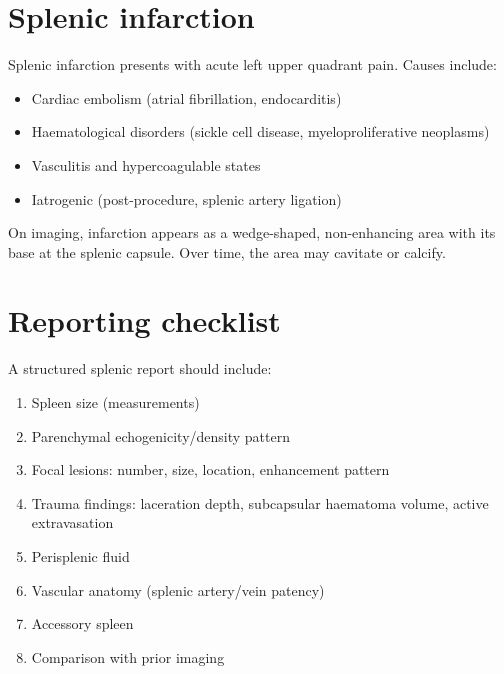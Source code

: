 \section{Splenic infarction}
Splenic infarction presents with acute left upper quadrant pain. Causes include:
\begin{itemize}
    \item Cardiac embolism (atrial fibrillation, endocarditis)
    \item Haematological disorders (sickle cell disease, myeloproliferative neoplasms)
    \item Vasculitis and hypercoagulable states
    \item Iatrogenic (post-procedure, splenic artery ligation)
\end{itemize}
On imaging, infarction appears as a wedge-shaped, non-enhancing area with its base at the splenic capsule. Over time, the area may cavitate or calcify.

\section{Reporting checklist}
A structured splenic report should include:
\begin{enumerate}
    \item Spleen size (measurements)
    \item Parenchymal echogenicity/density pattern
    \item Focal lesions: number, size, location, enhancement pattern
    \item Trauma findings: laceration depth, subcapsular haematoma volume, active extravasation
    \item Perisplenic fluid
    \item Vascular anatomy (splenic artery/vein patency)
    \item Accessory spleen
    \item Comparison with prior imaging
\end{enumerate}

\clearpage
